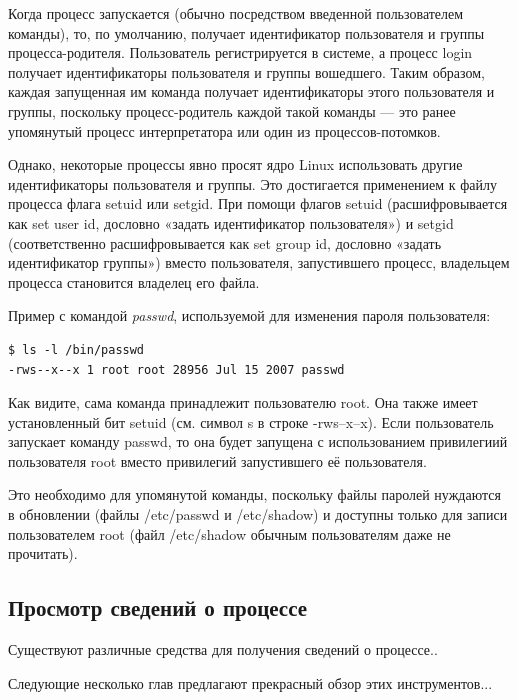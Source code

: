 \documentclass[10pt]{book}
\begin{document}
Когда процесс запускается (обычно посредством введенной пользователем команды), то, по умолчанию, получает идентификатор пользователя и группы процесса-родителя. Пользователь регистрируется в системе, а процесс login получает идентификаторы пользователя и группы вошедшего. Таким образом, каждая запущенная им команда получает идентификаторы этого пользователя и группы, поскольку процесс-родитель каждой такой команды — это ранее упомянутый процесс интерпретатора или один из процессов-потомков.

Однако, некоторые процессы явно просят ядро Linux использовать другие идентификаторы пользователя и группы. Это достигается применением к файлу процесса флага setuid или setgid. При помощи флагов setuid (расшифровывается как set user id, дословно «задать идентификатор пользователя») и setgid (соответственно расшифровывается как set group id, дословно «задать идентификатор группы») вместо пользователя, запустившего процесс, владельцем процесса становится владелец его файла.

Пример с командой \textit{passwd}, используемой для изменения пароля пользователя: 

\vspace{3mm}
\begin{tcolorbox}
\begin{lstlisting}
$ ls -l /bin/passwd
-rws--x--x 1 root root 28956 Jul 15 2007 passwd
\end{lstlisting}
\end{tcolorbox}

Как видите, сама команда принадлежит пользователю root. Она также имеет установленный бит setuid (см. символ s в строке -rws--x--x). Если пользователь запускает команду passwd, то она будет запущена с использованием привилегиий пользователя root вместо привилегий запустившего её пользователя. 

Это необходимо для упомянутой команды, поскольку файлы паролей нуждаются в обновлении (файлы /etc/passwd и /etc/shadow) и доступны только для записи пользователем root (файл /etc/shadow обычным пользователям даже не прочитать).

\subsection{Просмотр сведений о процессе}

Существуют различные средства для получения сведений о процессе.. 

Следующие несколько глав предлагают прекрасный обзор этих инструментов...
\end{document}

